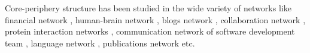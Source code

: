 \documentclass[conference]{IEEEtran}
\begin{document}
 


Core-periphery structure has been studied in the wide variety of networks like financial network \cite{fricke2015core}, human-brain network \cite{bassett2013task}, blogs network \cite{obradovic2009journey}, collaboration network \cite{leydesdorff2013international}, protein interaction networks \cite{luo2009core}, communication network of software development team \cite{crowston2006core}, language network \cite{fedorenko2014reworking}, publications network \cite{catini2015identifying} etc. 



\end{document}
